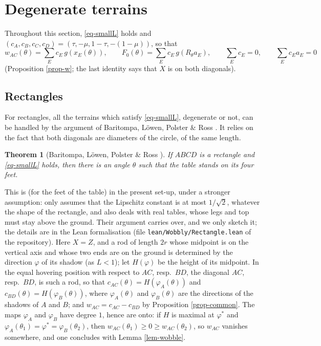 \documentclass[a4paper,11pt,twoside,leqno]{article}
\newtheorem{teo}{Theorem}[section]
\numberwithin{equation}{section}
\begin{document}
\section{Degenerate terrains}\label{s-degen}

Throughout this section, \eqref{eq-smallL} holds and $(c_A,c_B,c_C,c_D) = (\tau,-\mu,1-\tau,-(1-\mu))$, so that
\[
w_{AC}(\theta) = \sum_E c_E\, g(x_E(\theta)),
\qquad
F_0(\theta) = \sum_E c_E\, g(R_\theta a_E),
\qquad
\sum_E c_E = 0,
\qquad
\sum_E c_E a_E = 0
\]
(Proposition \ref{prop-w}; the last identity says that $X$ is on both diagonals).

\subsection{Rectangles}

For rectangles, all the terrains which satisfy \eqref{eq-smallL}, degenerate or not, can be handled by the argument of Baritompa, L\"owen, Polster \& Ross \cite{BLPR}. It relies on the fact that both diagonals are diameters of the circle, of the same length.

\begin{teo}[Baritompa, L\"owen, Polster \& Ross \cite{BLPR}]\label{teo-rect}
If $ABCD$ is a rectangle and \eqref{eq-smallL} holds, then there is an angle $\theta$ such that the table stands on its four feet.
\end{teo}

This is \cite[Theorem 2]{BLPR} (for the feet of the table) in the present set-up, under a stronger assumption: \cite{BLPR} only assumes that the Lipschitz constant is at most $1/\sqrt{2}$, whatever the shape of the rectangle, and also deals with real tables, whose legs and top must stay above the ground. Their argument carries over, and we only sketch it; the details are in the Lean formalisation (file \texttt{lean/Wobbly/Rectangle.lean} of the repository). Here $X = Z$, and a rod of length $2r$ whose midpoint is on the vertical axis and whose two ends are on the ground is determined by the direction $\varphi$ of its shadow (as $L < 1$); let $H(\varphi)$ be the height of its midpoint. In the equal hovering position with respect to $AC$, resp.\ $BD$, the diagonal $AC$, resp.\ $BD$, is such a rod, so that $c_{AC}(\theta) = H(\varphi_A(\theta))$ and $c_{BD}(\theta) = H(\varphi_B(\theta))$, where $\varphi_A(\theta)$ and $\varphi_B(\theta)$ are the directions of the shadows of $A$ and $B$; and $w_{AC} = c_{AC} - c_{BD}$ by Proposition \ref{prop-common}. The maps $\varphi_A$ and $\varphi_B$ have degree $1$, hence are onto: if $H$ is maximal at $\varphi^*$ and $\varphi_A(\theta_1) = \varphi^* = \varphi_B(\theta_2)$, then $w_{AC}(\theta_1) \geq 0 \geq w_{AC}(\theta_2)$, so $w_{AC}$ vanishes somewhere, and one concludes with Lemma \ref{lem-wobble}.
\end{document}
